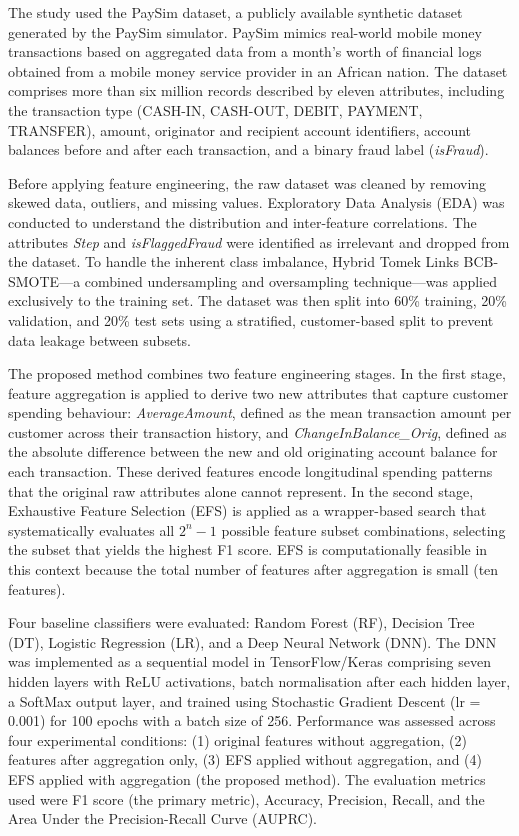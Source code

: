 \documentclass[12pt, a4paper]{report}
\begin{document}
The study used the PaySim dataset, a publicly available synthetic dataset generated by the PaySim simulator. PaySim mimics real-world mobile money transactions based on aggregated data from a month's worth of financial logs obtained from a mobile money service provider in an African nation. The dataset comprises more than six million records described by eleven attributes, including the transaction type (CASH-IN, CASH-OUT, DEBIT, PAYMENT, TRANSFER), amount, originator and recipient account identifiers, account balances before and after each transaction, and a binary fraud label (\textit{isFraud}).

Before applying feature engineering, the raw dataset was cleaned by removing skewed data, outliers, and missing values. Exploratory Data Analysis (EDA) was conducted to understand the distribution and inter-feature correlations. The attributes \textit{Step} and \textit{isFlaggedFraud} were identified as irrelevant and dropped from the dataset. To handle the inherent class imbalance, Hybrid Tomek Links BCB-SMOTE---a combined undersampling and oversampling technique---was applied exclusively to the training set. The dataset was then split into 60\% training, 20\% validation, and 20\% test sets using a stratified, customer-based split to prevent data leakage between subsets.

The proposed method combines two feature engineering stages. In the first stage, feature aggregation is applied to derive two new attributes that capture customer spending behaviour: \textit{AverageAmount}, defined as the mean transaction amount per customer across their transaction history, and \textit{ChangeInBalance\_Orig}, defined as the absolute difference between the new and old originating account balance for each transaction. These derived features encode longitudinal spending patterns that the original raw attributes alone cannot represent. In the second stage, Exhaustive Feature Selection (EFS) is applied as a wrapper-based search that systematically evaluates all $2^n - 1$ possible feature subset combinations, selecting the subset that yields the highest F1 score. EFS is computationally feasible in this context because the total number of features after aggregation is small (ten features).

Four baseline classifiers were evaluated: Random Forest (RF), Decision Tree (DT), Logistic Regression (LR), and a Deep Neural Network (DNN). The DNN was implemented as a sequential model in TensorFlow/Keras comprising seven hidden layers with ReLU activations, batch normalisation after each hidden layer, a SoftMax output layer, and trained using Stochastic Gradient Descent (lr = 0.001) for 100 epochs with a batch size of 256. Performance was assessed across four experimental conditions: (1) original features without aggregation, (2) features after aggregation only, (3) EFS applied without aggregation, and (4) EFS applied with aggregation (the proposed method). The evaluation metrics used were F1 score (the primary metric), Accuracy, Precision, Recall, and the Area Under the Precision-Recall Curve (AUPRC).
\end{document}
